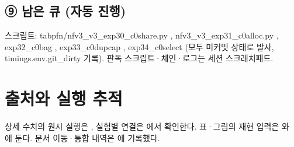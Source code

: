 \subsection*{⑨ 남은 큐 (자동 진행)}
스크립트: tabpfn/\allowbreak{}nfv3\_\allowbreak{}v3\_\allowbreak{}exp30\_\allowbreak{}c0share.py , nfv3\_\allowbreak{}v3\_\allowbreak{}exp31\_\allowbreak{}c0alloc.py , exp32\_\allowbreak{}c0bag , exp33\_\allowbreak{}c0dupcap , exp34\_\allowbreak{}c0select (모두 미커밋 상태로 발사, timings.env.git\_\allowbreak{}dirty 기록). 판독 스크립트·체인·로그는 세션 스크래치패드.



\section*{출처와 실행 추적}

상세 수치의 원시 실행은 , 실험별 연결은 에서 확인한다. 표·그림의 재현 입력은 와 에 둔다. 문서 이동·통합 내역은 에 기록했다.


